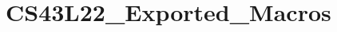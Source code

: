 \hypertarget{group___c_s43_l22___exported___macros}{}\section{C\+S43\+L22\+\_\+\+Exported\+\_\+\+Macros}
\label{group___c_s43_l22___exported___macros}
